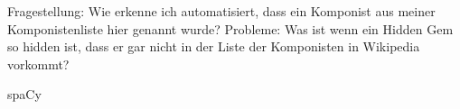 \documentclass{beamer}
\begin{document}
\begin{Named Entity Recogition}
	Fragestellung: Wie erkenne ich automatisiert, dass ein Komponist aus meiner Komponistenliste hier genannt wurde?
	Probleme:
	Was ist wenn ein Hidden Gem so hidden ist, dass er gar nicht in der Liste der Komponisten in Wikipedia vorkommt?
	
\end{Named Entity Recogition}
\begin{frame}{spaCy}
	
\end{frame}
\end{document}
